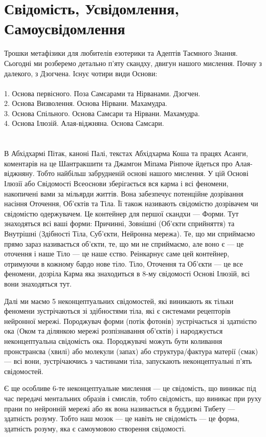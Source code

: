 \section{Свідомість, Усвідомлення, Самоусвідомлення}

Трошки метафізики для любителів езотерики та Адептів Таємного Знання.
Сьогодні ми розберемо детально п'яту скандху, двигун нашого мислення.
Почну з далекого, з Дзогчена. Існує чотири види Основи:
\\
\\
1. Основа первісного. Поза Самсарами та Нірванами. Дзогчен.\\
2. Основа Визволення. Основа Нірвани. Махамудра.\\
3. Основа Спільного. Основа Самсари та Нірвани. Махамудра.\\
4. Основа Ілюзій. Алая-віджняна. Основа Самсари.\\
\\
\\
В Абхідхармі Пітак, каноні Палі, текстах Абхідхарма Коша та працях Асанги,
коментарів на це Шантракшити та Джамгон Міпама Рінпоче йдеться
про Алая-віджняну. Тобто найбільш забрудненій основі нашого мислення.
У цій Основі Ілюзії або Свідомості Всеоснови зберігається вся карма
і всі феномени, накопичені вами за мільярди життів. Вона забезпечує
потенційне дозрівання насіння Оточення, Об'єктів та Тіла. Її також називають
свідомістю дозрівачем чи свідомістю одержувачем. Це контейнер для
першої скандхи --- Форми. Тут знаходяться всі ваші форми: Причинні,
Зовнішні (Об'єкти сприйняття) та Внутрішні (Здібності Тіла, Суб'єкти, Нейронна мережа).
Те, що ми сприймаємо прямо зараз називається об'єкти, те, що ми не сприймаємо,
але воно є --- це оточення і наше Тіло --- це наше єство. Реінкарнує саме цей контейнер,
отримуючи в кожному бардо нове тіло. Тіло, Оточення та Об'єкти ---
це все феномени, дозріла Карма яка знаходиться в 8-му свідомості Основі Ілюзій, всі вони знаходяться тут.

Далі ми маємо 5 неконцептуальних свідомостей, які виникають як тільки
феномени зустрічаються зі здібностями тіла, які є системами рецепторів
нейронної мережі. Породжувач форми (потік фотонів) зустрічається зі здатністю
ока (Оком та ділянкою мережі розпізнавання об'єктів) і народжується неконцептуальна
свідомість ока. Породжувачі можуть бути коливання пронстрансва (хвилі) або
молекули (запах) або структура/фактура матерії (смак) --- всі вони,
зустрічаючись з частинами тіла, запускають неконцептуальні п'ять свідомостей.

Є ще особливе 6-те неконцептуальне мислення --- це свідомість, що виникає під
час передачі ментальних образів і смислів, тобто свідомість, що виникає при руху
прани по нейронній мережі або як вона називається в буддизмі Тибету ---
здатність розуму. Тобто наш мозок --- це навіть не свідомість ---
це форма, здатність розуму, яка є самоумовою створення свідомості.

